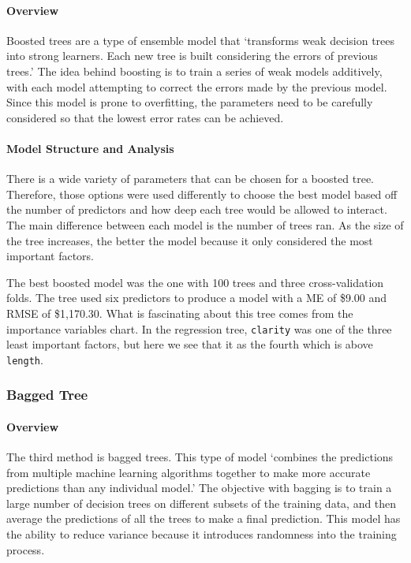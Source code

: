 \documentclass[
  paper=a4,
  ,captions=tableheading
]{scrartcl}
\begin{document}
\hypertarget{overview-1}{%
\paragraph{Overview}\label{overview-1}}

Boosted trees are a type of ensemble model that `transforms weak
decision trees into strong learners. Each new tree is built considering
the errors of previous trees.' The idea behind boosting is to train a
series of weak models additively, with each model attempting to correct
the errors made by the previous model. Since this model is prone to
overfitting, the parameters need to be carefully considered so that the
lowest error rates can be achieved.

\hypertarget{model-structure-and-analysis-1}{%
\paragraph{Model Structure and
Analysis}\label{model-structure-and-analysis-1}}

There is a wide variety of parameters that can be chosen for a boosted
tree. Therefore, those options were used differently to choose the best
model based off the number of predictors and how deep each tree would be
allowed to interact. The main difference between each model is the
number of trees ran. As the size of the tree increases, the better the
model because it only considered the most important factors.

The best boosted model was the one with 100 trees and three
cross-validation folds. The tree used six predictors to produce a model
with a ME of \$9.00 and RMSE of \$1,170.30. What is fascinating about
this tree comes from the importance variables chart. In the regression
tree, \texttt{clarity} was one of the three least important factors, but
here we see that it as the fourth which is above \texttt{length}.

\hypertarget{bagged-tree}{%
\subsubsection{Bagged Tree}\label{bagged-tree}}

\hypertarget{overview-2}{%
\paragraph{Overview}\label{overview-2}}

The third method is bagged trees. This type of model `combines the
predictions from multiple machine learning algorithms together to make
more accurate predictions than any individual model.' The objective with
bagging is to train a large number of decision trees on different
subsets of the training data, and then average the predictions of all
the trees to make a final prediction. This model has the ability to
reduce variance because it introduces randomness into the training
process.
\end{document}
